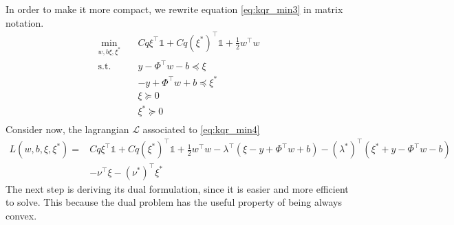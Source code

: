 In order to make it more compact, we rewrite equation \ref{eq:kqr_min3} in matrix notation.
\begin{equation}\label{eq:kqr_min4}
    \begin{aligned}
        \min_{w,b\xi,\xi^*} \quad & C q \xi^\intercal \mathbb{1}+ C q (\xi^*)^\intercal \mathbb{1}+ \frac{1}{2}w^\intercal w\\
    \textrm{s.t.} \quad & y-\Phi^\intercal w -b \preceq \xi\\
    & -y+\Phi^\intercal w +b \preceq \xi^*\\
      &\xi\succeq0    \\
      &\xi^*\succeq0    \\
    \end{aligned}
    \end{equation}
Consider now, the lagrangian $\mathcal{L}$ associated to \ref{eq:kqr_min4}
\begin{equation}\label{eq:kqr_min5}
    \begin{aligned}
    L(w,b,\xi,\xi^*)= & C q \xi^\intercal \mathbb{1}+ C q (\xi^*)^\intercal \mathbb{1}+ \frac{1}{2}w^\intercal w- \lambda^\intercal(\xi - y+\Phi^\intercal w +b)
    - (\lambda^*)^\intercal(\xi^* +y-\Phi^\intercal w -b)
    \\
    & -\nu^\intercal \xi - (\nu^*)^\intercal \xi^*
\end{aligned}
\end{equation}
The next step is deriving its dual formulation, since it is easier and more efficient to solve. This because the dual problem has the useful property of being always convex.

